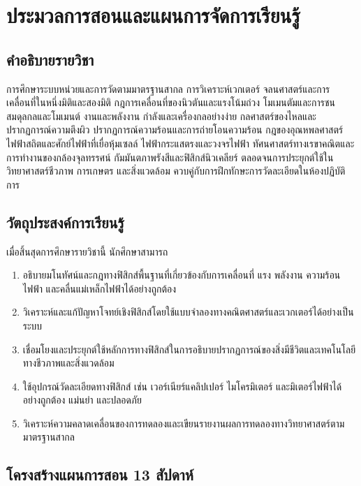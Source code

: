 \chapter*{ประมวลการสอนและแผนการจัดการเรียนรู้}

\section*{คำอธิบายรายวิชา}
การศึกษาระบบหน่วยและการวัดตามมาตรฐานสากล การวิเคราะห์เวกเตอร์ จลนศาสตร์และการเคลื่อนที่ในหนึ่งมิติและสองมิติ กฎการเคลื่อนที่ของนิวตันและแรงโน้มถ่วง โมเมนตัมและการชน สมดุลกลและโมเมนต์ งานและพลังงาน กำลังและเครื่องกลอย่างง่าย กลศาสตร์ของไหลและปรากฏการณ์ความตึงผิว ปรากฏการณ์ความร้อนและการถ่ายโอนความร้อน กฎของอุณหพลศาสตร์ ไฟฟ้าสถิตและศักย์ไฟฟ้าที่เยื่อหุ้มเซลล์ ไฟฟ้ากระแสตรงและวงจรไฟฟ้า ทัศนศาสตร์ทางเรขาคณิตและการทำงานของกล้องจุลทรรศน์ กัมมันตภาพรังสีและฟิสิกส์นิวเคลียร์ ตลอดจนการประยุกต์ใช้ในวิทยาศาสตร์ชีวภาพ การเกษตร และสิ่งแวดล้อม ควบคู่กับการฝึกทักษะการวัดละเอียดในห้องปฏิบัติการ

\section*{วัตถุประสงค์การเรียนรู้}
เมื่อสิ้นสุดการศึกษารายวิชานี้ นักศึกษาสามารถ
\begin{enumerate}
    \item อธิบายมโนทัศน์และกฎทางฟิสิกส์พื้นฐานที่เกี่ยวข้องกับการเคลื่อนที่ แรง พลังงาน ความร้อน ไฟฟ้า และคลื่นแม่เหล็กไฟฟ้าได้อย่างถูกต้อง
    \item วิเคราะห์และแก้ปัญหาโจทย์เชิงฟิสิกส์โดยใช้แบบจำลองทางคณิตศาสตร์และเวกเตอร์ได้อย่างเป็นระบบ
    \item เชื่อมโยงและประยุกต์ใช้หลักการทางฟิสิกส์ในการอธิบายปรากฏการณ์ของสิ่งมีชีวิตและเทคโนโลยีทางชีวภาพและสิ่งแวดล้อม
    \item ใช้อุปกรณ์วัดละเอียดทางฟิสิกส์ เช่น เวอร์เนียร์แคลิปเปอร์ ไมโครมิเตอร์ และมิเตอร์ไฟฟ้าได้อย่างถูกต้อง แม่นยำ และปลอดภัย
    \item วิเคราะห์ความคลาดเคลื่อนของการทดลองและเขียนรายงานผลการทดลองทางวิทยาศาสตร์ตามมาตรฐานสากล
\end{enumerate}

\section*{โครงสร้างแผนการสอน 13 สัปดาห์}

